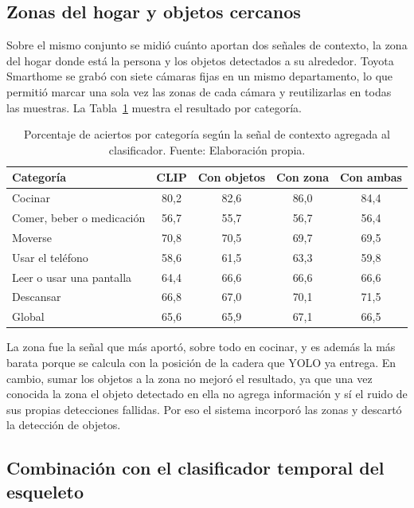\subsection{Zonas del hogar y objetos cercanos}

Sobre el mismo conjunto se midió cuánto aportan dos señales de contexto, la zona del hogar donde está la persona y los objetos detectados a su alrededor.
Toyota Smarthome se grabó con siete cámaras fijas en un mismo departamento, lo que permitió marcar una sola vez las zonas de cada cámara y reutilizarlas en todas las muestras.
La Tabla~\ref{tab:actividades_contexto} muestra el resultado por categoría.

\begin{table}[H]
\centering
\caption[Aciertos por categoría según la señal de contexto agregada.]{Porcentaje de aciertos por categoría según la señal de contexto agregada al clasificador. Fuente: Elaboración propia.}
\label{tab:actividades_contexto}
\small
\begin{tabular}{@{}lcccc@{}}
\toprule
\textbf{Categoría} & \textbf{CLIP} & \textbf{Con objetos} & \textbf{Con zona} & \textbf{Con ambas} \\
\midrule
Cocinar & 80,2 & 82,6 & 86,0 & 84,4 \\
Comer, beber o medicación & 56,7 & 55,7 & 56,7 & 56,4 \\
Moverse & 70,8 & 70,5 & 69,7 & 69,5 \\
Usar el teléfono & 58,6 & 61,5 & 63,3 & 59,8 \\
Leer o usar una pantalla & 64,4 & 66,6 & 66,6 & 66,6 \\
Descansar & 66,8 & 67,0 & 70,1 & 71,5 \\
\midrule
Global & 65,6 & 65,9 & 67,1 & 66,5 \\
\bottomrule
\end{tabular}
\end{table}

La zona fue la señal que más aportó, sobre todo en cocinar, y es además la más barata porque se calcula con la posición de la cadera que YOLO ya entrega.
En cambio, sumar los objetos a la zona no mejoró el resultado, ya que una vez conocida la zona el objeto detectado en ella no agrega información y sí el ruido de sus propias detecciones fallidas.
Por eso el sistema incorporó las zonas y descartó la detección de objetos.

\subsection{Combinación con el clasificador temporal del esqueleto}

